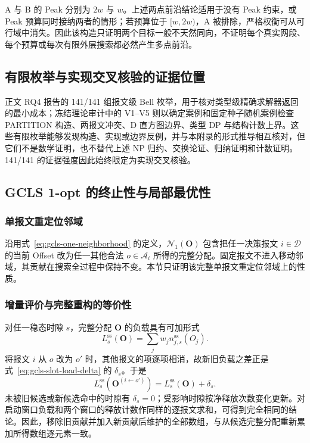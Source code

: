 \documentclass[UTF8,a4paper,twoside,zihao=-4]{ctexart}
\numberwithin{equation}{section}
\numberwithin{figure}{section}
\numberwithin{table}{section}
\theoremstyle{definition}
\newcommand{\Oset}{\mathcal{A}}
\numberwithin{algocf}{section}
\begin{document}
A 与 B 的 Peak 分别为 $2w$ 与 $w$。上述两点前沿结论适用于没有 Peak 约束，或 Peak 预算同时接纳两者的情形；若预算位于 $[w,2w)$，A 被排除，严格权衡可从可行域中消失。因此该构造只证明两个目标一般不天然同向，不证明每个真实网段、每个预算或每次有限外层搜索都必然产生多点前沿。

\subsection{有限枚举与实现交叉核验的证据位置}
\label{subsec:appendix-theory-verification}

正文 RQ4 报告的 141/141 组报文级 Bell 枚举，用于核对类型级精确求解器返回的最小成本；冻结理论审计中的 V1--V5 则以确定案例和固定种子随机案例检查 PARTITION 构造、两报文冲突、D 直方图边界、类型 DP 与结构计数上界。这些有限枚举能够发现构造、实现或边界反例，并与本附录的形式推导相互核对，但它们不是数学证明，也不替代上述 NP 归约、交换论证、归纳证明和计数证明。141/141 的证据强度因此始终限定为实现交叉核验。

\subsection{GCLS 1-opt 的终止性与局部最优性}
\label{subsec:appendix-gcls-proof}

\subsubsection{单报文重定位邻域}
\label{subsubsec:appendix-one-neighborhood}

沿用式~\eqref{eq:gcls-one-neighborhood} 的定义，$\mathcal N_1(\boldsymbol O)$
包含把任一决策报文 $i\in\mathcal D$ 的当前 Offset 改为任一其他合法
$o\in\Oset_i$ 所得的完整分配。固定报文不进入移动邻域，其贡献在搜索全过程中保持不变。本节只证明该完整单报文重定位邻域上的性质。

\subsubsection{增量评价与完整重构的等价性}
\label{subsubsec:appendix-delta-proof}

对任一稳态时隙 $s$，完整分配 $\boldsymbol O$ 的负载具有可加形式
\[
 L_s^{\mathrm{ss}}(\boldsymbol O)
 =
 \sum_j w_j n_{j,s}^{\mathrm{ss}}(O_j).
\]
将报文 $i$ 从 $o$ 改为 $o'$ 时，其他报文的项逐项相消，故新旧负载之差正是式~\eqref{eq:gcls-slot-load-delta} 的 $\delta_s$。于是
\[
 L_s^{\mathrm{ss}}(\boldsymbol O^{(i\leftarrow o')})
 =
 L_s^{\mathrm{ss}}(\boldsymbol O)+\delta_s.
\]
未被旧候选或新候选命中的时隙有 $\delta_s=0$；受影响时隙按净释放次数变化更新。对启动窗口负载和两个窗口的释放计数作同样的逐报文求和，可得到完全相同的结论。因此，移除旧贡献并加入新贡献后维护的全部数组，与从候选完整分配重新累加所得数组逐元素一致。
\end{document}
